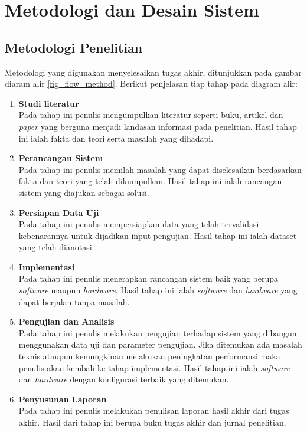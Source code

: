 \chapter{Metodologi dan Desain Sistem}
\section{Metodologi Penelitian}
Metodologi yang digunakan menyelesaikan tugas akhir, ditunjukkan pada gambar diaram alir \ref{fig_flow_method}. Berikut penjelasan tiap tahap pada diagram alir:
\begin{enumerate}
	\item \textbf{Studi literatur} \\
	Pada tahap ini penulis mengumpulkan literatur seperti buku, artikel dan \textit{paper} yang berguna menjadi landasan informasi pada penelitian. Hasil tahap ini ialah fakta dan teori serta masalah yang dihadapi.
	\item \textbf{Perancangan Sistem} \\
	Pada tahap ini penulis memilah masalah yang dapat diselesaikan berdasarkan fakta dan teori yang telah dikumpulkan. Hasil tahap ini ialah rancangan sistem yang diajukan sebagai solusi.
	\item \textbf{Persiapan Data Uji} \\
	Pada tahap ini penulis mempersiapkan data yang telah tervalidasi kebenarannya untuk dijadikan input pengujian. Hasil tahap ini ialah dataset yang telah dianotasi.
	\item \textbf{Implementasi} \\
	Pada tahap ini penulis menerapkan rancangan sistem baik yang berupa \textit{software} maupun \textit{hardware}. Hasil tahap ini ialah \textit{software} dan \textit{hardware} yang dapat berjalan tanpa masalah.
	\item \textbf{Pengujian dan Analisis} \\
	Pada tahap ini penulis melakukan pengujian terhadap sistem yang dibangun menggunakan data uji dan parameter pengujian. Jika ditemukan ada masalah teknis ataupun kemungkinan melakukan peningkatan performansi maka penulis akan kembali ke tahap implementasi. Hasil tahap ini ialah \textit{software} dan \textit{hardware} dengan konfigurasi terbaik yang ditemukan.
	\item \textbf{Penyusunan Laporan} \\
	Pada tahap ini penulis melakukan penulisan laporan hasil akhir dari tugas akhir. Hasil dari tahap ini berupa buku tugas akhir dan jurnal penelitian.
\end{enumerate}

